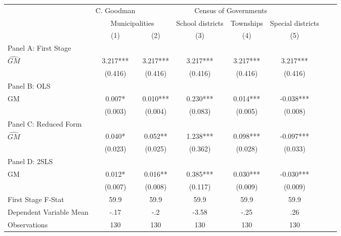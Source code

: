  \begin{tabular}{l*{7}{c}} \toprule
&\multicolumn{1}{c}{C. Goodman}&\multicolumn{4}{c}{Census of Governments}\\\cmidrule(lr){2-2}\cmidrule(lr){3-6}
&\multicolumn{2}{c}{Municipalities}&\multicolumn{1}{c}{School districts}&\multicolumn{1}{c}{Townships}&\multicolumn{1}{c}{Special districts}\\\cmidrule(lr){2-3}\cmidrule(lr){4-6}
&\multicolumn{1}{c}{(1)}&\multicolumn{1}{c}{(2)}&\multicolumn{1}{c}{(3)}&\multicolumn{1}{c}{(4)}&\multicolumn{1}{c}{(5)}\\
\cmidrule(lr){1-6}
\multicolumn{5}{l}{Panel A: First Stage}\\
\cmidrule(lr){1-6}
$\widehat{GM}$  &    3.217***&    3.217***&    3.217***&    3.217***&    3.217***\\
                &  (0.416)   &  (0.416)   &  (0.416)   &  (0.416)   &  (0.416)   \\
\cmidrule(lr){1-6}
\multicolumn{5}{l}{Panel B: OLS}\\
\cmidrule(lr){1-6}
GM              &    0.007*  &    0.010***&    0.230***&    0.014***&   -0.038***\\
                &  (0.003)   &  (0.004)   &  (0.083)   &  (0.005)   &  (0.008)   \\
\cmidrule(lr){1-6}
\multicolumn{5}{l}{Panel C: Reduced Form}\\
\cmidrule(lr){1-6}
$\widehat{GM}$  &    0.040*  &    0.052** &    1.238***&    0.098***&   -0.097***\\
                &  (0.023)   &  (0.025)   &  (0.362)   &  (0.028)   &  (0.033)   \\
\cmidrule(lr){1-6}
\multicolumn{5}{l}{Panel D: 2SLS}\\
\cmidrule(lr){1-6}
GM              &    0.012*  &    0.016** &    0.385***&    0.030***&   -0.030***\\
                &  (0.007)   &  (0.008)   &  (0.117)   &  (0.009)   &  (0.009)   \\
\midrule
First Stage F-Stat&     59.9   &     59.9   &     59.9   &     59.9   &     59.9   \\
Dependent Variable Mean&     -.17   &      -.2   &    -3.58   &     -.25   &      .26   \\
Observations    &      130   &      130   &      130   &      130   &      130   \\
 \bottomrule \end{tabular}
